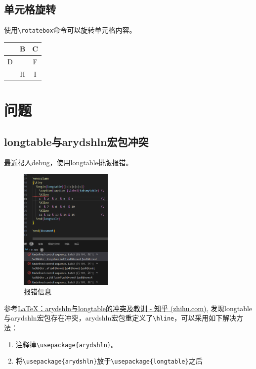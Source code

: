 \subsection{单元格旋转}\label{sec:cell-rotate}
使用\lstinline{\rotatebox}命令可以旋转单元格内容。

\begin{codeshow}
    \begin{tabular}{|c|c|c|}
        \hline
        \rotatebox{90}{A}           & B                 & C \\
        \hline
        D                           & \rotatebox{45}{E} & F \\
        \hline
        \rotatebox[origin=l]{90}{G} & H                 & I \\
        \hline
    \end{tabular}
\end{codeshow}




\section{问题}

\subsection{longtable与arydshln宏包冲突}\label{subsec:longtable-arydshln-conflict}
最近帮人debug，使用longtable排版报错。
\begin{figure}[!h]
    \centering
    \includegraphics[width=0.4\textwidth]{figure/chap-tab/ary1.png}
    \caption{报错信息}
\end{figure}

参考\href{https://zhuanlan.zhihu.com/p/667681242}{LaTeX：arydshln与longtable的冲突及教训 - 知乎 (zhihu.com)}, 发现longtable与arydshln宏包存在冲突，arydshln宏包重定义了\lstinline{\hline}，可以采用如下解决方法：
\begin{enumerate}
    \item 注释掉\lstinline|\usepackage{arydshln}|。
    \item 将\lstinline|\usepackage{arydshln}|放于\lstinline|\usepackage{longtable}|之后
\end{enumerate}

